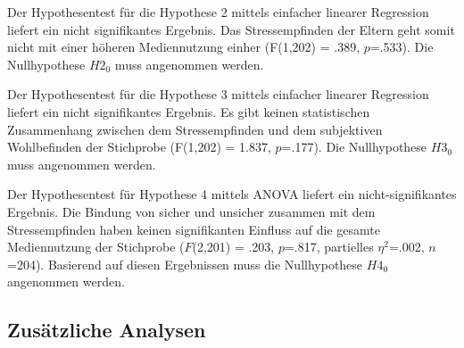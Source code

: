 Der Hypothesentest für die Hypothese 2 mittels einfacher linearer Regression liefert ein nicht signifikantes Ergebnis. Das Stressempfinden der Eltern geht somit nicht mit einer höheren Mediennutzung einher (F(1,202) = .389, $p$=.533). Die Nullhypothese $H2_{0}$ muss angenommen werden.

Der Hypothesentest für die Hypothese 3 mittels einfacher linearer Regression liefert ein nicht signifikantes Ergebnis. Es gibt keinen statistischen Zusammenhang zwischen dem Stressempfinden und dem subjektiven Wohlbefinden der Stichprobe (F(1,202) = 1.837, $p$=.177).  Die Nullhypothese $H3_{0}$ muss angenommen werden.

Der Hypothesentest für Hypothese 4 mittels ANOVA liefert ein nicht-signifikantes Er\-gebnis. Die Bindung von sicher und unsicher zusammen mit dem Stressempfinden haben keinen signifikanten Einfluss auf die ge\-samte Medien\-nutzung der Stichprobe ($F$(2,201) = .203, $p$=.817, partielles $\eta^2$=.002, $n$=204). Basierend auf diesen Ergebnissen muss die Nullhypothese $H4_{0}$ angenommen werden. 

\subsection{Zusätzliche Analysen} \label{sec:ZusätzlicheAnalysen}